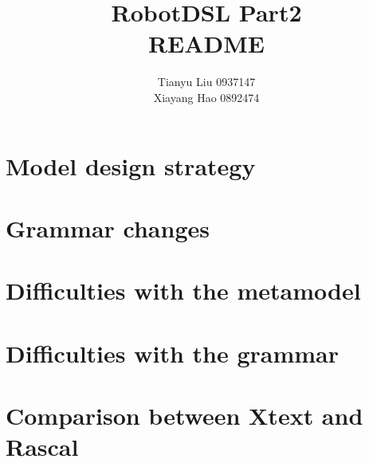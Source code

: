 \documentclass[]{article}
\title{RobotDSL Part2 \\
README}
\author{Tianyu Liu 0937147 \\
Xiayang Hao 0892474}
\begin{document}
\maketitle


\section{Model design strategy}

\section{Grammar changes}

\section{Difficulties with the metamodel}

\section{Difficulties with the grammar}

\section{Comparison between Xtext and Rascal}
\end{document}
